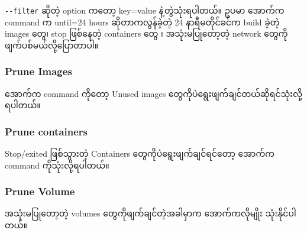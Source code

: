 \texttt{-\/-filter} ဆိုတဲ့ option ကတော့ key=value နဲ့တွဲသုံးရပါတယ်။ ဥပမာ
အောက်က command က until=24 hours ဆိုတာကလွန်ခဲ့တဲ့ 24 နာရီမတိုင်ခင်က build
ခဲ့တဲ့ images တွေ၊ stop ဖြစ်နေတဲ့ containers တွေ ၊ အသုံးမပြုတော့တဲ့
network တွေကိုဖျက်ပစ်မယ်လို့ပြောတာပါ။

\begin{Shaded}
\begin{Highlighting}[]
\NormalTok{$ }
\end{Highlighting}
\end{Shaded}

\hypertarget{prune-images}{%
\subsubsection{Prune Images}\label{prune-images}}

အောက်က command ကိုတော့ Unused images
တွေကိုပဲရွေးဖျက်ချင်တယ်ဆိုရင်သုံးလို့ရပါတယ်။

\begin{Shaded}
\begin{Highlighting}[]
\NormalTok{$ }
\end{Highlighting}
\end{Shaded}

\hypertarget{prune-containers}{%
\subsubsection{Prune containers}\label{prune-containers}}

Stop/exited ဖြစ်သွားတဲ့ Containers တွေကိုပဲရွေးဖျက်ချင်ရင်တော့ အောက်က
command ကိုသုံးလို့ရပါတယ်။

\begin{Shaded}
\begin{Highlighting}[]
\NormalTok{$ }
\end{Highlighting}
\end{Shaded}

\hypertarget{prune-volume}{%
\subsubsection{Prune Volume}\label{prune-volume}}

အသုံးမပြုတော့တဲ့ volumes တွေကိုဖျက်ချင်တဲ့အခါမှာက အောက်ကလိုမျိုး
သုံးနိုင်ပါတယ်။

\begin{Shaded}
\begin{Highlighting}[]
\NormalTok{$ }
\end{Highlighting}
\end{Shaded}

